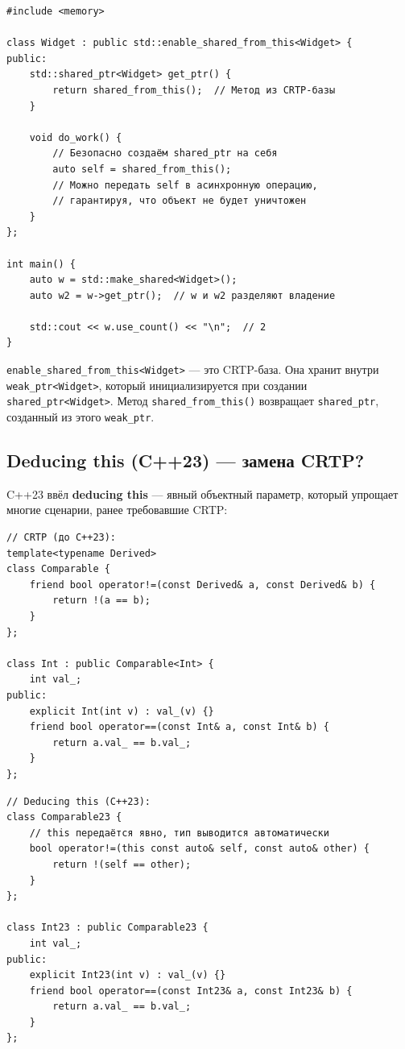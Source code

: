 \documentclass[a4paper,12pt]{article}
\begin{document}
\begin{lstlisting}
#include <memory>

class Widget : public std::enable_shared_from_this<Widget> {
public:
    std::shared_ptr<Widget> get_ptr() {
        return shared_from_this();  // Метод из CRTP-базы
    }

    void do_work() {
        // Безопасно создаём shared_ptr на себя
        auto self = shared_from_this();
        // Можно передать self в асинхронную операцию,
        // гарантируя, что объект не будет уничтожен
    }
};

int main() {
    auto w = std::make_shared<Widget>();
    auto w2 = w->get_ptr();  // w и w2 разделяют владение

    std::cout << w.use_count() << "\n";  // 2
}
\end{lstlisting}

\texttt{enable\_shared\_from\_this<Widget>} --- это CRTP-база. Она хранит
внутри \texttt{weak\_ptr<Widget>}, который инициализируется при создании
\texttt{shared\_ptr<Widget>}. Метод \texttt{shared\_from\_this()} возвращает
\texttt{shared\_ptr}, созданный из этого \texttt{weak\_ptr}.

\subsection{Deducing this (C++23) --- замена CRTP?}

C++23 ввёл \textbf{deducing this} --- явный объектный параметр, который
упрощает многие сценарии, ранее требовавшие CRTP:

\begin{lstlisting}
// CRTP (до C++23):
template<typename Derived>
class Comparable {
    friend bool operator!=(const Derived& a, const Derived& b) {
        return !(a == b);
    }
};

class Int : public Comparable<Int> {
    int val_;
public:
    explicit Int(int v) : val_(v) {}
    friend bool operator==(const Int& a, const Int& b) {
        return a.val_ == b.val_;
    }
};
\end{lstlisting}

\begin{lstlisting}
// Deducing this (C++23):
class Comparable23 {
    // this передаётся явно, тип выводится автоматически
    bool operator!=(this const auto& self, const auto& other) {
        return !(self == other);
    }
};

class Int23 : public Comparable23 {
    int val_;
public:
    explicit Int23(int v) : val_(v) {}
    friend bool operator==(const Int23& a, const Int23& b) {
        return a.val_ == b.val_;
    }
};
\end{lstlisting}
\end{document}
